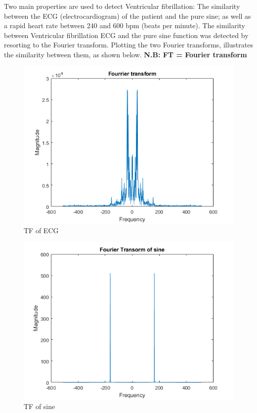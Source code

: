 \documentclass{article}
\begin{document}
Two main properties are used to detect Ventricular fibrillation: The similarity between the ECG (electrocardiogram) of the patient and the pure sine; as well as a rapid heart rate between 240 and 600 bpm (beats per minute).
The similarity between Ventricular fibrillation ECG and the pure sine function was detected by resorting to the Fourier transform. Plotting the two Fourier transforms, illustrates the similarity between them, as shown below.
\textbf{N.B: FT = Fourier transform}

\newpage

\begin{figure}
\centerline{\includegraphics[scale=0.6]{Fourrier_VF.png}}
\caption{TF of ECG}
\end{figure}
\begin{figure}
\centerline{\includegraphics[scale=0.6]{sin_fou.png}}
\caption{TF of sine}
\end{figure}
\end{document}

